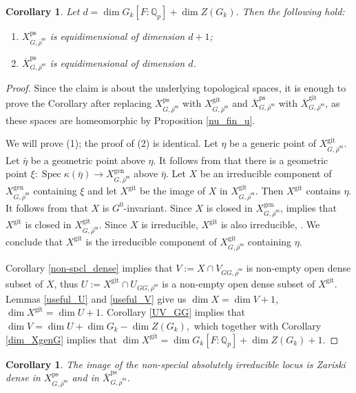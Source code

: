 \documentclass{amsart}
\newtheorem{cor}[prop]{Corollary}
\theoremstyle{definition}
\theoremstyle{remark}
\DeclareMathOperator{\Spec}{Spec}
\newcommand{\Qp}{\mathbb {Q}_p}
\newcommand{\rhobar}{\overline{\rho}}
\newcommand{\ps}{\mathrm{ps}}
\newcommand{\gen}{\mathrm{gen}}
\newcommand{\gps}{\mathrm{git}}
\newcommand{\Xbar}{\overline{X}}
\newcommand{\etabar}{\bar{\eta}}
\newcommand{\rhobarss}{\rhobar^{\mathrm{ss}}}
\begin{document}
\begin{cor}\label{BJ1} Let $d=\dim G_k[F:\Qp]+\dim Z(G_k)$. Then the following hold:
\begin{enumerate}
\item $X^{\ps}_{G, \rhobarss}$ is equidimensional of dimension $d+1$; 
\item $\Xbar^{\ps}_{G, \rhobarss}$ is equidimensional of dimension $d$.
\end{enumerate}
\end{cor} 
\begin{proof} Since the claim is about the underlying topological spaces, 
it is enough to prove the Corollary after replacing $X^{\ps}_{G, \rhobarss}$ with $X^{\gps}_{G, \rhobarss}$ 
and $\Xbar^{\ps}_{G, \rhobarss}$ with $\Xbar^{\gps}_{G, \rhobarss}$, as these spaces are homeomorphic by 
Proposition \ref{nu_fin_u}. 

We will prove (1); the proof of (2) is identical. Let $\eta$ be a
generic point of $X^{\gps}_{G, \rhobarss}$. Let $\etabar$ be a geometric point above $\eta$. 
It follows from \cite[Theorem 3 (ii)]{seshadri} that there is a geometric point $\xi: \Spec \kappa(\etabar)\rightarrow
X^{\gen}_{G, \rhobarss}$ above $\etabar$. Let $X$ be an irreducible component of $X^{\gen}_{G, \rhobarss}$
containing $\xi$ and let $X^{\gps}$ be the image of $X$ in $X^{\gps}_{G, \rhobarss}$. Then $X^{\gps}$ contains 
$\eta$. It follows from \cite[Lemma 2.1]{BIP_new} that $X$ is $G^0$-invariant. 
Since $X$ is closed in $X^{\gen}_{G, \rhobarss}$, \cite[Theorem 3 (iii)]{seshadri} implies that 
$X^{\gps}$ is closed in $X^{\gps}_{G, \rhobarss}$. Since $X$ is irreducible, $X^{\gps}$ is also irreducible, \cite[\href{https://stacks.math.columbia.edu/tag/0379}{Tag 0379}]{stacks-project}. We conclude that 
$X^{\gps}$ is the irreducible component of  $X^{\gps}_{G, \rhobarss}$ containing $\eta$.

Corollary \ref{non-spcl_dense} implies that $V:=X\cap V_{GG, \rhobarss}$ is non-empty 
open dense subset of $X$, thus $U:= X^{\gps}\cap U_{GG, \rhobarss}$ is a non-empty 
open dense subset of $X^{\gps}$. Lemmas \ref{useful_U} and \ref{useful_V} give us
$\dim X = \dim V+1$, $\dim X^{\gps}=\dim U+1$.
Corollary \ref{UV_GG} implies that 
$ \dim V = \dim U + \dim G_k - \dim Z(G_k),$
which together with Corollary \ref{dim_XgenG} implies that $\dim X^{\gps} = \dim G_k [F:\Qp] + \dim Z(G_k)+1$. 
\end{proof} 

\begin{cor}\label{BJ2} The image of the non-special absolutely irreducible locus is Zariski dense in 
$X^{\ps}_{G, \rhobarss}$ and in $\Xbar^{\ps}_{G, \rhobarss}$. 
\end{cor}
\end{document}
